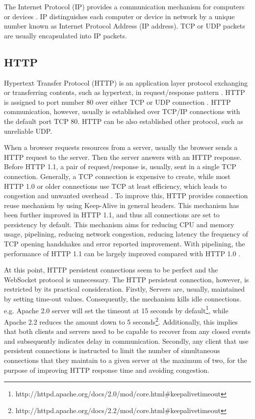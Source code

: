 The Internet Protocol (IP) provides a communication mechanism for computers or devices \cite{postel1981internet}. IP distinguishes each computer or device in network by a unique number known as Internet Protocol Address (IP address). TCP or UDP packets are usually encapsulated into IP packets.

\subsection{HTTP}

Hypertext Transfer Protocol (HTTP) is an application layer protocol exchanging or transferring contents, such as hypertext, in request/response pattern \cite{fielding1999hypertext}. HTTP is assigned to port number 80 over either TCP or UDP connection \cite{reynolds1994assigned}. HTTP communication, however, usually is established over TCP/IP connections with the default port TCP 80. HTTP can be also established other protocol, such as unreliable UDP.

When a browser requests resources from a server, usually the browser sends a HTTP request to the server. Then the server answers with an HTTP response. Before HTTP 1.1, a pair of request/response is, usually, sent in a single TCP connection. Generally, a TCP connection is expensive to create, while most HTTP 1.0 or older connections use TCP at least efficiency, which leads to congestion and unwanted overhead \cite{spero1994analysis}.  To improve this, HTTP provides connection reuse mechanism \cite{fieldingrfc} by using Keep-Alive in general headers. This mechanism has been further improved in HTTP 1.1, and thus all connections are set to persistency by default. This mechanism aims for reducing CPU and memory usage, pipelining, reducing network congestion, reducing latency the frequency of TCP opening handshakes and error reported improvement. With pipelining, the performance of HTTP 1.1 can be largely improved compared with HTTP 1.0 \cite{nielsen1997network}. 

At this point, HTTP persistent connections seem to be perfect and the WebSocket protocol is unnecessary. The HTTP persistent connection, however, is restricted by its practical consideration. Firstly, Servers are, usually, maintained by setting time-out values. Consequently, the mechanism kills idle connections. e.g. Apache 2.0 server will set the timeout at 15 seconds by default\footnote{http://httpd.apache.org/docs/2.0/mod/core.html\#keepalivetimeout}, while Apache 2.2 reduces the amount down to 5 seconds\footnote{http://httpd.apache.org/docs/2.2/mod/core.html\#keepalivetimeout}. Additionally, this implies that both clients and servers need to be capable to recover from any closed events and subsequently indicates delay in communication. Secondly, any client that use persistent connections is instructed to limit the number of simultaneous connections that they maintain to a given server at the maximum of two, for the purpose of improving HTTP response time and avoiding congestion. 

